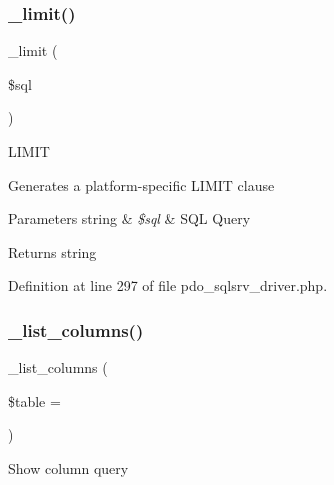 \mbox{\label{class_c_i___d_b__pdo__sqlsrv__driver_a3a02ea06541b8ecc25a33a61651562c8}} 
\subsubsection{\texorpdfstring{\_limit()}{\_limit()}}
{\footnotesize\ttfamily \+\_\+limit (\begin{DoxyParamCaption}\item[{}]{\$sql }\end{DoxyParamCaption})\hspace{0.3cm}{\ttfamily [protected]}}

L\+I\+M\+IT

Generates a platform-\/specific L\+I\+M\+IT clause


\begin{DoxyParams}[1]{Parameters}
string & {\em \$sql} & S\+QL Query \\
\hline
\end{DoxyParams}
\begin{DoxyReturn}{Returns}
string 
\end{DoxyReturn}


Definition at line 297 of file pdo\+\_\+sqlsrv\+\_\+driver.\+php.

\mbox{\label{class_c_i___d_b__pdo__sqlsrv__driver_a7ccb7f9c301fe7f0a9db701254142b63}} 
\subsubsection{\texorpdfstring{\_list\_columns()}{\_list\_columns()}}
{\footnotesize\ttfamily \+\_\+list\+\_\+columns (\begin{DoxyParamCaption}\item[{}]{\$table = {\ttfamily \textquotesingle{}\textquotesingle{}} }\end{DoxyParamCaption})\hspace{0.3cm}{\ttfamily [protected]}}

Show column query

